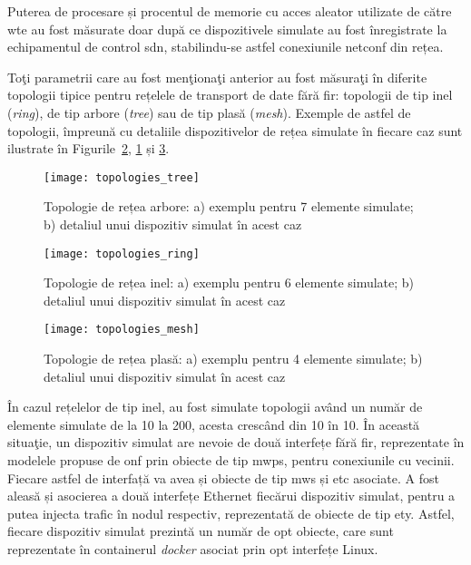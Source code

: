 Puterea de procesare și procentul de memorie cu acces aleator utilizate de către \gls{wte} au fost măsurate doar după ce dispozitivele simulate au fost înregistrate la echipamentul de control \gls{sdn}, stabilindu-se astfel conexiunile \gls{netconf} din rețea.

Toţi parametrii care au fost menţionaţi anterior au fost măsuraţi în diferite topologii tipice pentru rețelele de transport de date fără fir: topologii de tip inel (\textit{ring}), de tip arbore (\textit{tree}) sau de tip plasă (\textit{mesh}). Exemple de astfel de topologii, împreună cu detaliile dispozitivelor de rețea simulate în fiecare caz sunt ilustrate în Figurile~\ref{fig:topologies_ring}, \ref{fig:topologies_tree} și \ref{fig:topologies_mesh}.

\begin{figure}[h]
	\centering
	\texttt{[image: topologies\_tree]}
	\caption{Topologie de rețea arbore: a) exemplu pentru 7 elemente simulate; b) detaliul unui dispozitiv simulat în acest caz}
	\label{fig:topologies_tree}
\end{figure}

\begin{figure}[h]
	\centering
	\texttt{[image: topologies\_ring]}
	\caption{Topologie de rețea inel: a) exemplu pentru 6 elemente simulate; b) detaliul unui dispozitiv simulat în acest caz}
	\label{fig:topologies_ring}
\end{figure}

\begin{figure}[h]
	\centering
	\texttt{[image: topologies\_mesh]}
	\caption{Topologie de rețea plasă: a) exemplu pentru 4 elemente simulate; b) detaliul unui dispozitiv simulat în acest caz}
	\label{fig:topologies_mesh}
\end{figure}

În cazul rețelelor de tip inel, au fost simulate topologii având un număr de elemente simulate de la 10 la 200, acesta crescând din 10 în 10. În această situaţie, un dispozitiv simulat are nevoie de două interfețe fără fir, reprezentate în modelele propuse de \gls{onf} prin obiecte de tip \gls{mwps}, pentru conexiunile cu vecinii. Fiecare astfel de interfață va avea și obiecte de tip \gls{mws} și \gls{etc} asociate. A fost aleasă și asocierea a două interfețe Ethernet fiecărui dispozitiv simulat, pentru a putea injecta trafic în nodul respectiv, reprezentată de obiecte de tip \gls{ety}. Astfel, fiecare dispozitiv simulat prezintă un număr de opt obiecte, care sunt reprezentate în containerul \textit{docker} asociat prin opt interfețe Linux.

